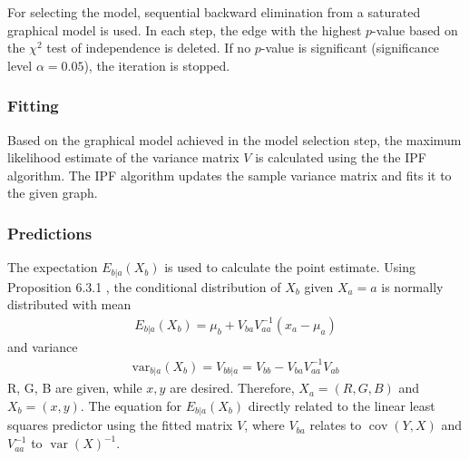 \documentclass{article}
\DeclareMathOperator{\cov}{cov}
\DeclareMathOperator{\var}{var}
\begin{document}

For selecting the model, sequential backward elimination from a
saturated graphical model is used. In each step, the edge with the
highest $p$-value based on the $\chi^2$ test of independence is
deleted. If no $p$-value is significant (significance level
$\alpha=0.05$), the iteration is stopped.\\

\subsubsection{Fitting}

Based on the graphical model achieved in the model selection step, the
maximum likelihood estimate of the variance matrix $V$ is calculated
using the the IPF algorithm. The IPF algorithm updates the sample
variance matrix and fits it to the given graph. 


\subsubsection{Predictions}

The expectation $E_{b | a}(X_b)$ is used to calculate the point
estimate.  Using Proposition 6.3.1 \parencite{whittaker2009graphical},
the conditional distribution of $X_b$ given $X_a = a$ is normally
distributed with mean
\begin{align}
  E_{b | a}(X_b) = \mu_b + V_{ba}V^{-1}_{aa}(x_a - \mu_a)
\end{align}
and variance
\begin{align}
  \text{var}_{b|a}(X_b) = V_{bb|a} = V_{bb} - V_{ba}V_{aa}^{-1}V_{ab}
\end{align}
R, G, B are given, while $x,y$ are desired. Therefore, $X_a = (R, G,
B)$ and $X_b = (x,y)$. The equation for $E_{b | a}(X_b)$ directly
related to the linear least squares predictor using the fitted matrix
$V$, where $V_{ba}$ relates to $\cov(Y, X)$ and $V^{-1}_{aa}$ to
$\var(X)^{-1}$.


\end{document}
